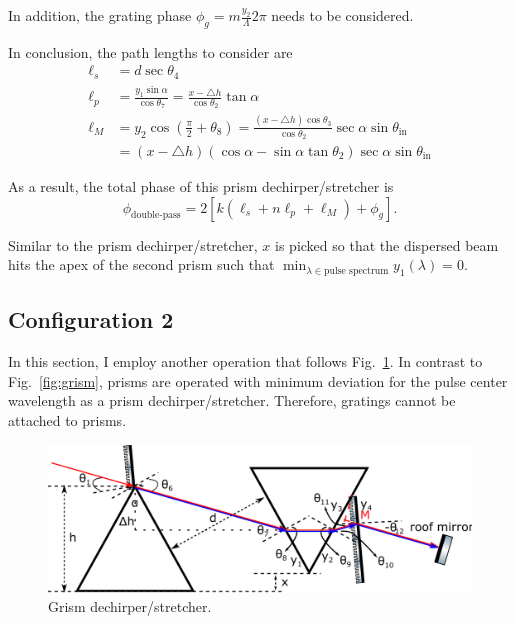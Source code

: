 \documentclass[12pt,hidelinks]{book}
\begin{document}
In addition, the grating phase $\displaystyle \phi_g=m\frac{y_2}{\Lambda}2\pi$ needs to be considered.

In conclusion, the path lengths to consider are
\begin{subequations}
\begin{align}
\ell_s & =d\sec\theta_4 \\
\ell_p & =\frac{y_1\sin\alpha}{\cos\theta_7}=\frac{x-\triangle h}{\cos\theta_2}\tan\alpha \\
\ell_M & =y_2\cos(\frac{\pi}{2}+\theta_8)=\frac{\left(x-\triangle h\right)\cos\theta_3}{\cos\theta_2}\sec\alpha\sin\theta_{\text{in}} \nonumber \\
& =\left(x-\triangle h\right)\left(\cos\alpha-\sin\alpha\tan\theta_2\right)\sec\alpha\sin\theta_{\text{in}}
\end{align}
\end{subequations}

As a result, the total phase of this prism dechirper/stretcher is
\begin{equation}
\phi_{\text{double-pass}}=2\left[k\left(\ell_s+n\ell_p+\ell_M\right)+\phi_g\right].
\end{equation}

Similar to the prism dechirper/stretcher, $x$ is picked so that the dispersed beam hits the apex of the second prism such that $\min_{\lambda\in\text{pulse spectrum}} y_1(\lambda)=0$.

\subsection{Configuration 2}
In this section, I employ another operation that follows Fig.~\ref{fig:grism2}. In contrast to Fig.~\ref{fig:grism}, prisms are operated with minimum deviation for the pulse center wavelength as a prism dechirper/stretcher. Therefore, gratings cannot be attached to prisms.

\begin{figure}[htbp]
\centering
\includegraphics[width=.7\linewidth]{grism v3.pdf}
\caption{Grism dechirper/stretcher.}
\label{fig:grism2}
\end{figure}
\end{document}
